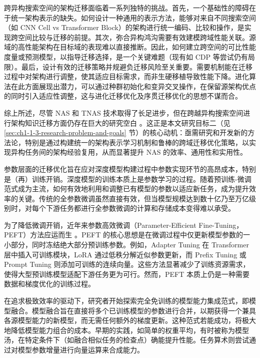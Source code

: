 \documentclass[../main.tex]{subfiles}
\begin{document}
跨异构搜索空间的架构迁移面临着一系列独特的挑战。首先，一个基础性的障碍在于统一架构表示的缺失\cite{neuralarchitecturesearch_elsken_2019}。如何设计一种通用的表示方法，能够对来自不同搜索空间（如 CNN Cell vs Transformer Block）的架构进行统一编码、比较和操作，是实现跨空间比较与迁移的前提。其次，弥合异构鸿沟需要有效建模跨域性能关联。源域的高性能架构在目标域的表现难以直接推断。因此，如何建立跨空间的可比性能度量或预测模型，以指导迁移选择，是一个关键难题（现有如 CDP 等尝试仍有局限）。最后，设计有效的迁移策略并规避负迁移风险至关重要。需要机制能在迁移过程中对架构进行调整，使其适应目标需求，而非生硬移植导致性能下降。进化算法在此方面展现出潜力，可以通过种群初始化和变异交叉操作，在保留源架构优点的同时引入适应性调整\cite{cmaevolutionstrategy_hansen_2016,regularizedevolutionimage_real_2019}，这与进化迁移优化及序贯迁移优化\cite{evolutionarysequentialtransfer_xue_2022,solutiontransferevolutionary_xue_2023}的思想不谋而合。

综上所述，尽管 NAS 和 TNAS 技术取得了长足进步，但在跨越异构搜索空间进行架构知识迁移方面仍存在巨大的研究空白 。这正是本文研究目标二（见 \ref{sec:ch1-1-3-research-problem-and-goals} 节）的核心动机：亟需研究和开发新的方法论，特别是通过构建统一的架构表示学习机制和鲁棒的跨域迁移优化策略，以实现异构任务间的架构经验复用，从而显著提升 NAS 的效率、通用性和实用性。

\label{sec:ch1-2-3-parameter-transfer-status-limitations}

参数层面的迁移优化旨在应对深度模型构建过程中参数实现环节的高昂成本，特别是（再）训练开销。深度模型的训练本质上是参数学习的过程。随着预训练-微调范式成为主流，如何有效地利用和调整已有模型的参数以适应新任务，成为提升效率的关键。传统的全参数微调虽然直接有效，但当模型规模达到数十亿乃至万亿级别时，对每个下游任务都进行全参数微调的计算和存储成本变得难以承受。

为了降低微调开销，近年来参数高效微调（Parameter-Efficient Fine-Tuning，PEFT）方法应运而生 。PEFT 的核心思想是在微调过程中仅更新模型参数的一小部分，同时冻结绝大部分预训练参数。例如，Adapter Tuning 在 Transformer 层中插入可训练模块\cite{parameterefficienttransfer_houlsby_2019}，LoRA 通过低秩分解近似参数更新\cite{loralowrank_hu_2022}，而 Prefix Tuning 或 Prompt Tuning 则添加可训练的连续向量\cite{prefixtuningoptimizing_li_2021,powerscaleparameter_lester_2021}。这些方法显著减少了训练资源需求，使得大型预训练模型适配下游任务更为可行。然而，PEFT 本质上仍是一种需要数据和梯度优化的训练过程。

在追求极致效率的驱动下，研究者开始探索完全免训练的模型能力集成范式，即模型融合\cite{modelmergingllms_yang_2024}。模型融合旨在直接将多个已训练模型的参数进行合并，以期获得一个兼具各源模型能力的新模型，而无需任何额外的梯度更新。这种范式若能成功，将极大地降低模型能力组合的成本。早期的实践，如简单的权重平均，有时被称为模型汤\cite{modelsoupsaveraging_wortsman_2022}，在特定条件下（如融合相似任务的检查点）确能提升性能。任务算术\cite{editingmodelstask_ilharco_2023}则尝试通过对模型参数增量进行向量运算来合成能力。
\end{document}
